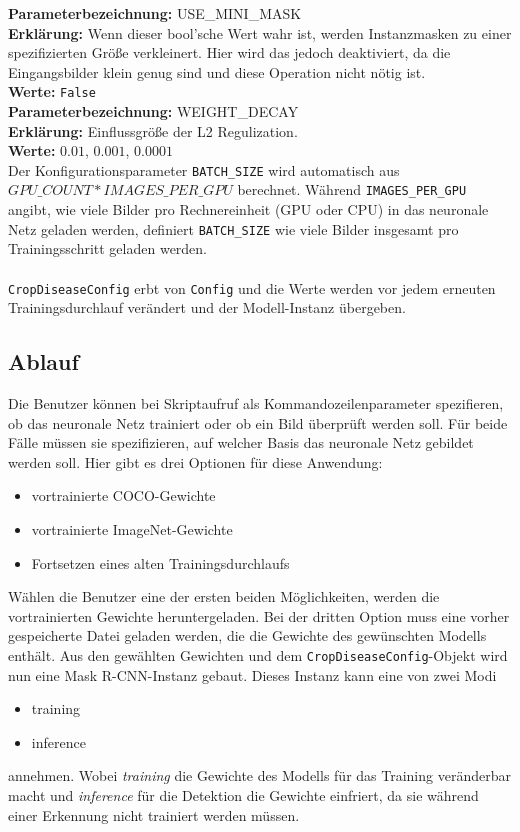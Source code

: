 \noindent
\textbf{Parameterbezeichnung:} USE\_MINI\_MASK\\
\textbf{Erklärung:} Wenn dieser bool'sche Wert wahr ist, werden Instanzmasken zu einer spezifizierten Größe verkleinert. Hier wird das jedoch deaktiviert, da die Eingangsbilder klein genug sind und diese Operation nicht nötig ist.\\
\textbf{Werte:} \texttt{False}\\

\noindent
\textbf{Parameterbezeichnung:} WEIGHT\_DECAY\\
\textbf{Erklärung:} Einflussgröße der L2 Regulization.\\
\textbf{Werte:} $0.01$, $0.001$, $0.0001$\\

\noindent
Der Konfigurationsparameter \texttt{BATCH\_SIZE} wird automatisch aus $GPU\_COUNT * IMAGES\_PER\_GPU$ berechnet. Während \texttt{IMAGES\_PER\_GPU} angibt, wie viele Bilder pro Rechnereinheit (GPU oder CPU) in das neuronale Netz geladen werden, definiert \texttt{BATCH\_SIZE} wie viele Bilder insgesamt pro Trainingsschritt geladen werden.
\\\\
\texttt{CropDiseaseConfig} erbt von \texttt{Config} und die Werte werden vor jedem erneuten Trainingsdurchlauf verändert und der Modell-Instanz übergeben.  

\subsection{Ablauf}

Die Benutzer können bei Skriptaufruf als Kommandozeilenparameter spezifieren, ob das neuronale Netz trainiert oder ob ein Bild überprüft werden soll. Für beide Fälle müssen sie spezifizieren, auf welcher Basis das neuronale Netz gebildet werden soll. Hier gibt es drei Optionen für diese Anwendung:

\begin{itemize}
	\item vortrainierte COCO-Gewichte
	\item vortrainierte ImageNet-Gewichte
	\item Fortsetzen eines alten Trainingsdurchlaufs
\end{itemize}
\noindent
Wählen die Benutzer eine der ersten beiden Möglichkeiten, werden die vortrainierten Gewichte heruntergeladen. Bei der dritten Option muss eine vorher gespeicherte Datei geladen werden, die die Gewichte des gewünschten Modells enthält. Aus den gewählten Gewichten und dem \texttt{CropDiseaseConfig}-Objekt wird nun eine Mask R-CNN-Instanz gebaut. Dieses Instanz kann eine von zwei Modi 
\begin{itemize}
	\item training
	\item inference
\end{itemize}
annehmen. Wobei \textit{training} die Gewichte des Modells für das Training veränderbar macht und \textit{inference} für die Detektion die Gewichte einfriert, da sie während einer Erkennung nicht trainiert werden müssen.

